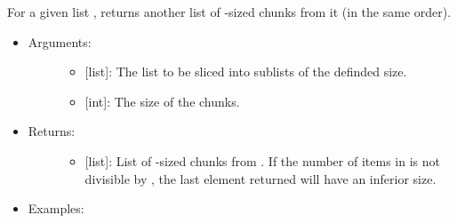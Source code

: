 \documentclass[letterpaper,10pt,english]{sphinxmanual}
\begin{document}
\begin{fulllineitems}
\label{\detokenize{iterables:data_tools.iterables.chunk_this}}
For a given list , returns another list of -sized chunks from
it (in the same order).
\begin{itemize}
\item {} \begin{description}
\item[{Arguments:}] \leavevmode\begin{itemize}
\item {} 
 {[}list{]}: The list to be sliced into sublists of the
definded size.

\item {} 
 {[}int{]}: The size of the chunks.

\end{itemize}

\end{description}

\item {} \begin{description}
\item[{Returns:}] \leavevmode\begin{itemize}
\item {} 
{[}list{]}: List of -sized chunks from .  If the
number of items in  is not divisible by , the last
element returned will have an inferior size.

\end{itemize}

\end{description}

\item {} \begin{description}
\item[{Examples:}] \leavevmode
{}%
\begin{sphinxVerbatim}[commandchars=\\\{\}]
  
 
 
\end{sphinxVerbatim}

\end{description}

\end{itemize}

\end{fulllineitems}
\end{document}
